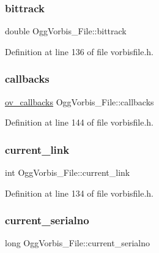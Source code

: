 \subsubsection{\texorpdfstring{bittrack}{bittrack}}
{\footnotesize\ttfamily double Ogg\+Vorbis\+\_\+\+File\+::bittrack}



Definition at line 136 of file vorbisfile.\+h.

\mbox{\label{struct_ogg_vorbis___file_afb1474e24193f577dd21395a76199415}} 
\subsubsection{\texorpdfstring{callbacks}{callbacks}}
{\footnotesize\ttfamily \mbox{\hyperlink{structov__callbacks}{ov\+\_\+callbacks}} Ogg\+Vorbis\+\_\+\+File\+::callbacks}



Definition at line 144 of file vorbisfile.\+h.

\mbox{\label{struct_ogg_vorbis___file_a9b2d64c3739364ac4c08070aac2e0588}} 
\subsubsection{\texorpdfstring{current\_link}{current\_link}}
{\footnotesize\ttfamily int Ogg\+Vorbis\+\_\+\+File\+::current\+\_\+link}



Definition at line 134 of file vorbisfile.\+h.

\mbox{\label{struct_ogg_vorbis___file_ad7545f86b92a6d66641f3d04a2497763}} 
\subsubsection{\texorpdfstring{current\_serialno}{current\_serialno}}
{\footnotesize\ttfamily long Ogg\+Vorbis\+\_\+\+File\+::current\+\_\+serialno}



